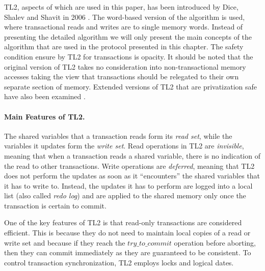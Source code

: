 TL2, aspects of which are used in this paper, has been introduced by Dice, Shalev and Shavit in 2006 \cite{DSS06}.
The word-based version of the algorithm is used, %
where transactional reads and writes are to single memory words.
Instead of presenting the detailed algorithm we will only present the main concepts of the algorithm
that are used in the protocol presented in this chapter.
The safety condition ensure by TL2 for transactions is opacity.
It should be noted that the original version of TL2 takes no consideration into non-transactional memory
accesses taking the view that transactions should be relegated to their own separate section of memory.
Extended versions of TL2 that are privatization safe have also been examined \cite{DSS10}.
\paragraph{Main Features of TL2.} The shared variables  that a  transaction reads form its {\it read
set}, while the variables it updates form the {\it write set}. 
Read operations in TL2 are {\it invisible},  meaning  that when  a  transaction reads  a  shared 
variable,  there is no indication of the read to other transactions.  Write operations are  
{\it deferred}, meaning that  TL2 does not perform the updates  as soon as  it {}``encounters'' 
the shared  variables that  it has to write to. Instead, the 
updates it has to perform are logged into a local list (also called {\it redo log}) and   are  applied 
to the shared  memory only once the transaction is certain  to commit.

One of the key features of TL2 is that read-only transactions are considered efficient.
This is because they do not need to maintain 
local copies of a read or write set  and because if they reach the $try\_to\_commit$
operation before aborting, then they can commit immediately as they are guaranteed
to be consistent.
To control transaction synchronization, TL2 employs locks and logical dates. 



